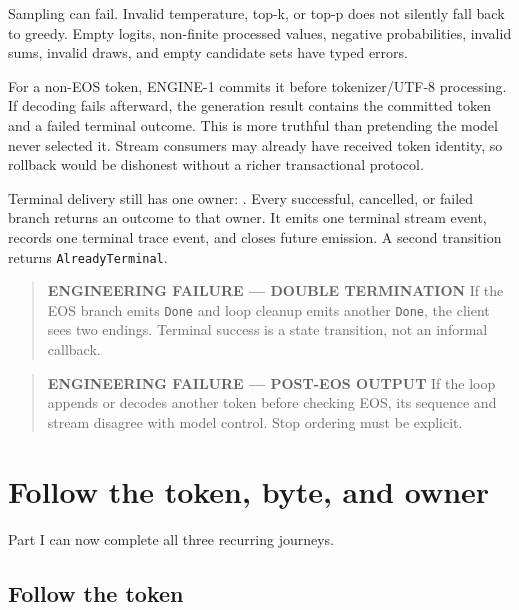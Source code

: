 Sampling can fail. Invalid temperature, top-k, or top-p does not
silently fall back to greedy. Empty logits, non-finite processed values,
negative probabilities, invalid sums, invalid draws, and empty candidate
sets have typed errors.

For a non-EOS token, ENGINE-1 commits it before tokenizer/UTF-8
processing. If decoding fails afterward, the generation result contains
the committed token and a failed terminal outcome. This is more truthful
than pretending the model never selected it. Stream consumers may
already have received token identity, so rollback would be dishonest
without a richer transactional protocol.

Terminal delivery still has one owner:
\texttt{}. Every successful, cancelled, or
failed branch returns an outcome to that owner. It emits one terminal
stream event, records one terminal trace event, and closes future
emission. A second transition returns \texttt{AlreadyTerminal}.

\begin{quote}
\textbf{ENGINEERING FAILURE --- DOUBLE TERMINATION} If the EOS branch
emits \texttt{Done} and loop cleanup emits another \texttt{Done}, the
client sees two endings. Terminal success is a state transition, not an
informal callback.
\end{quote}

\begin{quote}
\textbf{ENGINEERING FAILURE --- POST-EOS OUTPUT} If the loop appends or
decodes another token before checking EOS, its sequence and stream
disagree with model control. Stop ordering must be explicit.
\end{quote}

\section{Follow the token, byte, and
owner}\label{follow-the-token-byte-and-owner-1}

Part I can now complete all three recurring journeys.

\subsection{Follow the token}\label{follow-the-token-1}

